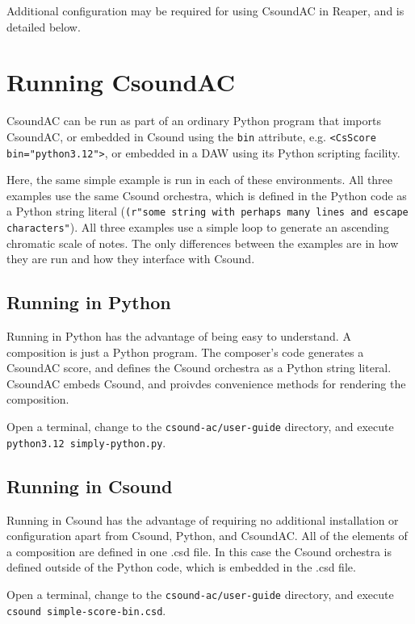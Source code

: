 \documentclass[letterpaper,10pt]{scrartcl}
\begin{document}
Additional configuration may be required for using CsoundAC in Reaper, and is detailed below.

\section{Running CsoundAC}

CsoundAC can be run as part of an ordinary Python program that imports CsoundAC, or embedded in Csound using the \texttt{bin} attribute, e.g. \lstinline|<CsScore bin="python3.12">|, or embedded in a DAW using its Python scripting facility. 

Here, the same simple example is run in each of these environments. All three examples use the same Csound orchestra, which is defined in the Python code as a Python string literal (\lstinline|(r"some string with perhaps many lines and escape characters"|). All three examples use a simple loop to generate an ascending chromatic scale of notes. The only differences between the examples are in how they are run and how they interface with Csound.

\subsection{Running in Python}

Running in Python has the advantage of being easy to understand. A composition is just a Python program. The composer's code generates a CsoundAC score, and defines the Csound orchestra as a Python string literal. CsoundAC embeds Csound, and proivdes convenience methods for rendering the composition.

Open a terminal, change to the \lstinline|csound-ac/user-guide| directory, and execute \lstinline|python3.12 simply-python.py|.

\subsection{Running in Csound}

Running in Csound has the advantage of requiring no additional installation or configuration apart from Csound, Python, and CsoundAC. All of the elements of a composition are defined in one .csd file. In this case the Csound orchestra is defined outside of the Python code, which is embedded in the .csd file.

Open a terminal, change to the \lstinline|csound-ac/user-guide| directory, and execute \lstinline|csound simple-score-bin.csd|.
\end{document}
